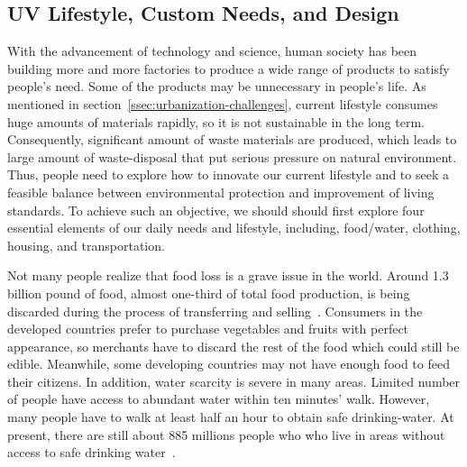 \documentclass[letterpaper, twocolumn, 10pt, conference]{IEEEtran}
\begin{document}
\subsection{UV Lifestyle, Custom Needs, and Design}
\label{ssec:UVLifesyle}


With the advancement of technology and science, human society has been building more and more factories to produce a wide range of products to satisfy people’s need. Some of the products may be unnecessary in people’s life.
As mentioned in section~\ref{ssec:urbanization-challenges}, current lifestyle consumes huge amounts of materials rapidly, so it is not sustainable in the long term. Consequently, significant amount of waste materials are produced, which leads to large amount of waste-disposal that put serious pressure on natural environment.  Thus, people need to explore how to innovate our current lifestyle and to seek a feasible balance between environmental protection and improvement of living standards. To achieve such an objective, we should should first explore four essential elements of our daily needs and lifestyle, including, food/water, clothing, housing, and transportation.





Not many people realize that food loss is a grave issue in the world. Around 1.3 billion pound of food, almost one-third of total food production, is being discarded during the process of transferring and selling~\cite{FAO2018Food}.  Consumers in the developed countries prefer to purchase vegetables and fruits with perfect appearance, so merchants have to discard the rest of the food which could still be edible. Meanwhile, some developing countries may not have enough food to feed their citizens.
In addition, water scarcity is severe in many areas. Limited number of people have access to abundant water within ten minutes’ walk. However, many people have to walk at least half an hour to obtain safe drinking-water. At present, there are still about 885 millions people who who live in areas without access to safe drinking water~\cite{Water2017Water}.
\end{document}
